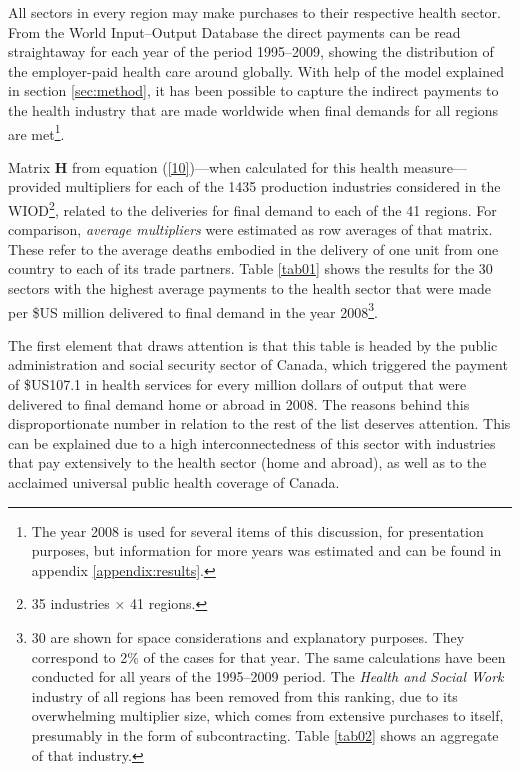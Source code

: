 \documentclass[a4paper,12pt]{article}
\begin{document}
All sectors in every region may make purchases to their respective health sector. From the World Input--Output Database the direct payments can be read straightaway for each year of the period 1995--2009, showing the distribution of the employer-paid health care around globally. With help of the model explained in section \ref{sec:method}, it has been possible to capture the indirect payments to the health industry that are made worldwide when final demands for all regions are met\footnote{The year 2008 is used for several items of this discussion, for presentation purposes, but information for more years was estimated and can be found in appendix \ref{appendix:results}.}.

Matrix $\mathbf{H}$ from equation (\ref{10})---when calculated for this health measure---provided multipliers for each of the 1435 production industries considered in the WIOD\footnote{35 industries $\times$ 41 regions.}, related to the deliveries for final demand to each of the 41 regions. For comparison, \textit{average multipliers} were estimated as row averages of that matrix. These refer to the average deaths embodied in the delivery of one unit from one country to each of its trade partners. Table \ref{tab01} shows the results for the 30 sectors with the highest average payments to the health sector that were made per \$US million delivered to final demand in the year 2008\footnote{30 are shown for space considerations and explanatory purposes. They correspond to 2\% of the cases for that year. The same calculations have been conducted for all years of the 1995--2009 period. The \textit{Health and Social Work} industry of all regions has been removed from this ranking, due to its overwhelming multiplier size, which comes from extensive purchases to itself, presumably in the form of subcontracting. Table \ref{tab02} shows an aggregate of that industry.}.  

The first element that draws attention is that this table is headed by the public administration and social security sector of Canada, which triggered the payment of \$US107.1 in health services for every million dollars of output that were delivered to final demand home or abroad in 2008. The reasons behind this disproportionate number in relation to the rest of the list deserves attention. This can be explained due to a high interconnectedness of this sector with industries that pay extensively to the health sector (home and abroad), as well as to the acclaimed universal public health coverage of Canada.
\end{document}
